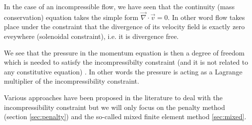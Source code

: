 
In the case of an incompressible flow, we have seen that the continuity (mass conservation)
equation takes the simple form ${\vec \nabla}\cdot{\vec v}=0$. In other word flow takes place 
under the constraint that the divergence of its velocity field is exactly zero eveywhere 
(solenoidal constraint), i.e. it is divergence free.  

We see that the pressure in the momentum equation is then a degree of freedom which is needed 
to satisfy the incompressibilty constraint (and it is not related to any constitutive equation)
\cite{dohu03}. In other words the pressure is acting as a Lagrange multiplier of the incompressibility
constraint. 

Various approaches have been proposed in the literature to deal with the 
incompressibility constraint but we will only focus on the penalty method 
(section \ref{sec:penalty}) and the so-called mixed finite element method
\ref{sec:mixed}.
